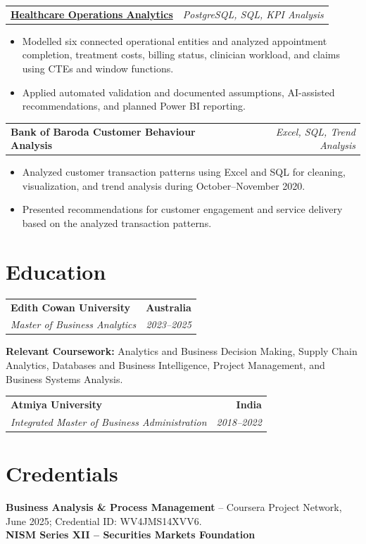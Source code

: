 \documentclass[letterpaper,10pt]{article}
\makeatletter
\newcommand{\role}[4]{%
  \begin{tabularx}{\textwidth}{@{}Xr@{}}
    \textbf{#1} & \textbf{#2} \\
    \textit{#3} & \textit{#4}
  \end{tabularx}\vspace{-1pt}
}
\newcommand{\project}[2]{%
  \begin{tabularx}{\textwidth}{@{}Xr@{}}
    \textbf{#1} & \textit{#2}
  \end{tabularx}\vspace{-1pt}
}
\makeatother
\begin{document}
\project{\href{https://github.com/jainalimehta/Healthcare-Analytics}{Healthcare Operations Analytics}}{PostgreSQL, SQL, KPI Analysis}
\begin{itemize}
  \item Modelled six connected operational entities and analyzed appointment completion, treatment costs, billing status, clinician workload, and claims using CTEs and window functions.
  \item Applied automated validation and documented assumptions, AI-assisted recommendations, and planned Power BI reporting.
\end{itemize}
\vspace{1pt}

\project{Bank of Baroda Customer Behaviour Analysis}{Excel, SQL, Trend Analysis}
\begin{itemize}
  \item Analyzed customer transaction patterns using Excel and SQL for cleaning, visualization, and trend analysis during October--November 2020.
  \item Presented recommendations for customer engagement and service delivery based on the analyzed transaction patterns.
\end{itemize}

\section{Education}
\role{Edith Cowan University}{Australia}{Master of Business Analytics}{2023--2025}
\small\textbf{Relevant Coursework:} Analytics and Business Decision Making, Supply Chain Analytics, Databases and Business Intelligence, Project Management, and Business Systems Analysis.\\[2pt]
\role{Atmiya University}{India}{Integrated Master of Business Administration}{2018--2022}

\section{Credentials}
\small\textbf{Business Analysis \& Process Management} -- Coursera Project Network, June 2025; Credential ID: WV4JMS14XVV6.\\[-0.2pt]
\small\textbf{NISM Series XII -- Securities Markets Foundation}
\end{document}
